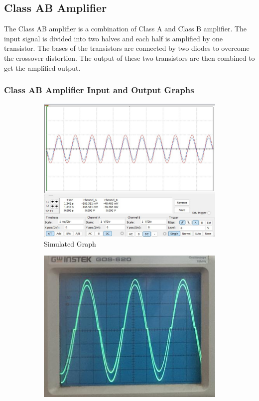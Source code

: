 \documentclass[12pt]{article}
\begin{document}
\subsection{Class AB Amplifier}
The Class AB amplifier is a combination of Class A and Class B amplifier. The input signal is divided into two halves and each half is amplified by one transistor. The bases of the transistors are connected by two diodes to overcome the crossover distortion. The output of these two transistors are then combined to get the amplified output.

\subsubsection{Class AB Amplifier Input and Output Graphs}

\begin{figure}[h!]
    \centering
    \begin{subfigure}{0.55\textwidth}
        \includegraphics[width=\textwidth]{Class_AB_Graph.jpg}
        \caption{Simulated Graph}
    \end{subfigure}
    \begin{subfigure}{0.55\textwidth}
        \includegraphics[width=\textwidth]{Class_AB_Practical.png}

\end{subfigure}
\end{figure}
\end{document}
